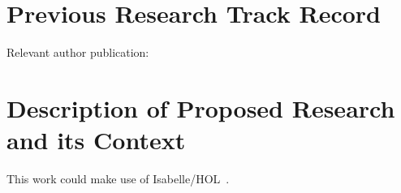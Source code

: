 \documentclass[hideinfo]{epsrc}
\begin{document}
\maketitle

\section{Previous Research Track Record}
\lipsum[1-3]

Relevant author publication:~

\clearpage

\section{Description of Proposed Research and its Context}
\lipsum[4-8]

This work could make use of Isabelle/HOL~\cite{nipkow.ea:concrete:2014}.

\clearpage
\singlecolprintbibliography
\end{document}
